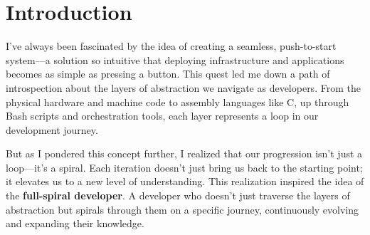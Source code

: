 \documentclass[../../main.tex]{subfiles}
\begin{document}
    \section{Introduction}

    I've always been fascinated by the idea of creating a seamless, push-to-start system—a solution so intuitive that deploying infrastructure and applications becomes as simple as pressing a button. This quest led me down a path of introspection about the layers of abstraction we navigate as developers. From the physical hardware and machine code to assembly languages like C, up through Bash scripts and orchestration tools, each layer represents a loop in our development journey.

    But as I pondered this concept further, I realized that our progression isn't just a loop—it's a spiral. Each iteration doesn't just bring us back to the starting point; it elevates us to a new level of understanding. This realization inspired the idea of the \textbf{full-spiral developer}. A developer who doesn't just traverse the layers of abstraction but spirals through them on a specific journey, continuously evolving and expanding their knowledge.

\end{document}
